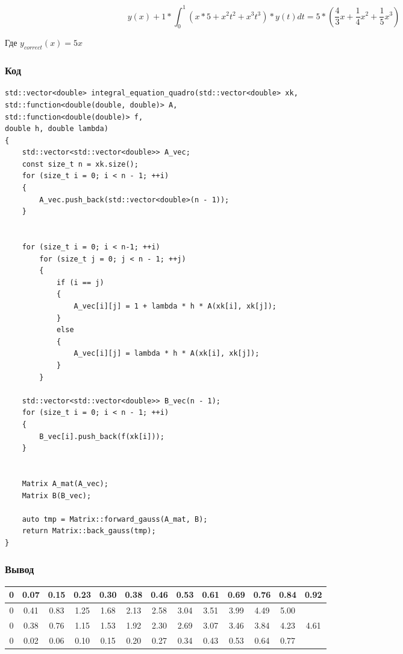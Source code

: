 \documentclass[bachelor, och, pract]{SCWorks}
\begin{document}
$$y(x) + 1 * \int_{0}^{1}(x * 5 + x^2t^2 + x^3t^3) * y(t)dt = 5 * (\frac{4}{3}x + \frac{1}{4}x^2 + \frac{1}{5}x^3)$$

Где $y_{correct}(x) = 5x$


\subsubsection{Код}

\begin{lstlisting}
std::vector<double> integral_equation_quadro(std::vector<double> xk,
std::function<double(double, double)> A, 
std::function<double(double)> f, 
double h, double lambda)
{
    std::vector<std::vector<double>> A_vec;
    const size_t n = xk.size();
    for (size_t i = 0; i < n - 1; ++i)
    {
        A_vec.push_back(std::vector<double>(n - 1));
    }


    for (size_t i = 0; i < n-1; ++i)
        for (size_t j = 0; j < n - 1; ++j)
        {
            if (i == j)
            {
                A_vec[i][j] = 1 + lambda * h * A(xk[i], xk[j]);
            }
            else
            {
                A_vec[i][j] = lambda * h * A(xk[i], xk[j]);
            }
        }

    std::vector<std::vector<double>> B_vec(n - 1);
    for (size_t i = 0; i < n - 1; ++i)
    {
        B_vec[i].push_back(f(xk[i]));
    }


    Matrix A_mat(A_vec);
    Matrix B(B_vec);

    auto tmp = Matrix::forward_gauss(A_mat, B);
    return Matrix::back_gauss(tmp);
}
\end{lstlisting}


\subsubsection{Вывод}

\begin{table}[H]
    \centering
    \begin{tabular}{|c|c|c|c|c|c|c|c|c|c|c|c|c|}
\hline 0   &  0.07   & 0.15  &  0.23& 0.30& 0.38&  0.46 &        0.53    & 0.61   &    0.69   &     0.76  & 0.84 & 0.92\\\hline
  0  &  0.41  & 0.83 &1.25&1.68& 2.13 &2.58&3.04&  3.51& 3.99  & 4.49  & 5.00 & \\\hline
  0 & 0.38& 0.76 & 1.15 & 1.53& 1.92& 2.30& 2.69 & 3.07 & 3.46  & 3.84 & 4.23 &  4.61 \\\hline
   0 & 0.02 &  0.06  & 0.10 &0.15 &0.20  & 0.27 &0.34  &       0.43   &   0.53   &   0.64 &  0.77 & \\\hline
    \end{tabular}
\end{table}
\end{document}
